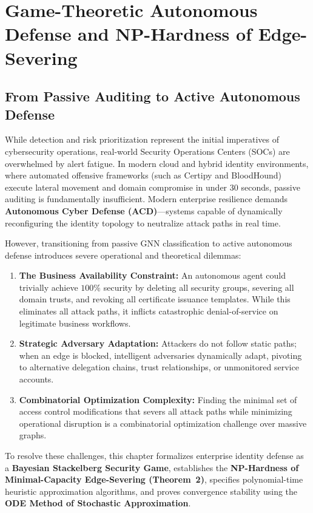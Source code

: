\chapter{Game-Theoretic Autonomous Defense and NP-Hardness of Edge-Severing}
\label{ch:game_theory}

\section{From Passive Auditing to Active Autonomous Defense}
While detection and risk prioritization represent the initial imperatives of cybersecurity operations, real-world Security Operations Centers (SOCs) are overwhelmed by alert fatigue. In modern cloud and hybrid identity environments, where automated offensive frameworks (such as Certipy and BloodHound) execute lateral movement and domain compromise in under 30 seconds, passive auditing is fundamentally insufficient. Modern enterprise resilience demands \textbf{Autonomous Cyber Defense (ACD)}---systems capable of dynamically reconfiguring the identity topology to neutralize attack paths in real time.

However, transitioning from passive GNN classification to active autonomous defense introduces severe operational and theoretical dilemmas:
\begin{enumerate}
    \item \textbf{The Business Availability Constraint:} An autonomous agent could trivially achieve $100\%$ security by deleting all security groups, severing all domain trusts, and revoking all certificate issuance templates. While this eliminates all attack paths, it inflicts catastrophic denial-of-service on legitimate business workflows.
    \item \textbf{Strategic Adversary Adaptation:} Attackers do not follow static paths; when an edge is blocked, intelligent adversaries dynamically adapt, pivoting to alternative delegation chains, trust relationships, or unmonitored service accounts.
    \item \textbf{Combinatorial Optimization Complexity:} Finding the minimal set of access control modifications that severs all attack paths while minimizing operational disruption is a combinatorial optimization challenge over massive graphs.
\end{enumerate}

To resolve these challenges, this chapter formalizes enterprise identity defense as a \textbf{Bayesian Stackelberg Security Game}, establishes the \textbf{NP-Hardness of Minimal-Capacity Edge-Severing (Theorem~2)}, specifies polynomial-time heuristic approximation algorithms, and proves convergence stability using the \textbf{ODE Method of Stochastic Approximation}.


